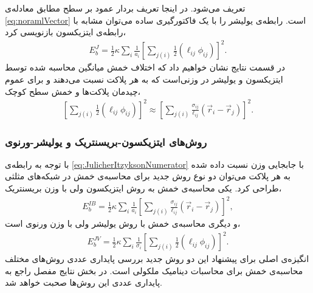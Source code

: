 تعریف می‌شود. در اینجا تعریف بردار عمود بر سطح مطابق معادله‌ی
\ref{eq:noramlVector}
است. رابطه‌ی یولیشر را با یک فاکتورگیری ساده می‌توان مشابه با رابطه‌ی ایتزیکسون بازنویسی کرد،
\begin{eqnarray}
E_{b}^{J}=\frac{1}{2}\kappa\sum_{i}\frac{1}{a_i}\left[\sum_{j(i)}\frac{1}{2}(\ell_{ij}\phi_{ij})\right]^2.
\label{eq:JulicherPotentialHalf}
\end{eqnarray}
در قسمت نتایج نشان خواهیم داد که اختلاف خمش میانگین محاسبه شده توسط ایتزیکسون و یولیشر در وزنی‌است که به هر پلاکت نسبت می‌دهند و برای عموم چیدمان‌ پلاکت‌ها و خمش سطح کوچک،
\begin{eqnarray}
\left[\sum_{j(i)}\frac{1}{2}(\ell_{ij}\phi_{ij})\right]^2\approx\left[\sum_{j(i)}\frac{\sigma_{ij}}{\ell_{ij}}(\vec r_i-\vec r_j)\right]^2.
\label{eq:JulicherItzyksonNumerator}
\end{eqnarray}


\subsubsection{
روش‌های ایتزیکسون-بریسنتریک و یولیشر-ورنوی
}
با توجه به رابطه‌ی 
\ref{eq:JulicherItzyksonNumerator}
با جابجایی وزن نسبت داده شده به هر پلاکت می‌توان دو نوع روش جدید برای محاسبه‌ی خمش در شبکه‌های مثلثی طراحی کرد. یکی محاسبه‌ی خمش به روش ایتزیکسون ولی با وزن بریسنتریک،
\begin{eqnarray}
E_{b}^{IB}=\frac{1}{2}\kappa\sum_{i}\frac{1}{a_i}\left[\sum_{j(i)}\frac{\sigma_{ij}}{\ell_{ij}}(\vec r_i-\vec r_j)\right]^2,
\label{eq:ItzyksonBarycentricPotential}
\end{eqnarray}
و دیگری محاسبه‌ی خمش با روش یولیشر ولی با وزن ورنوی است،
\begin{eqnarray}
E_{b}^{JV}=\frac{1}{2}\kappa\sum_{i}\frac{1}{\sigma_i}\left[\sum_{j(i)}\frac{1}{2}(\ell_{ij}\phi_{ij})\right]^2.
\label{eq:JulicherVoronoiPotential}
\end{eqnarray}
انگیزه‌ی اصلی برای پیشنهاد این دو روش جدید بررسی پایداری عددی روش‌های مختلف محاسبه‌ی خمش برای محاسبات دینامیک ملکولی است.  در بخش نتایج مفصل راجع به پایداری عددی این روش‌ها صحبت خواهد شد.








 